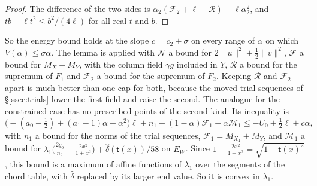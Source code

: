 \begin{proof}
The difference of the two sides is $\alpha_2(\mathcal F_2+\ell-\mathcal R)-\ell\alpha_2^2$, and
$tb-\ell t^2\le b^2/(4\ell)$ for all real $t$ and $b$.
\end{proof}

So the energy bound holds at the slope $c=c_2+\sigma$ on every range of $\alpha$ on which $V(\alpha)\le\sigma\alpha$.
The lemma is applied with $\mathcal N$ a bound for $2\|u\|^2+\frac12\|v\|^2$, $\mathcal F$ a bound for $M_X+M_Y$, with the
column field $\gamma g$ included in $Y$, $\mathcal R$ a bound for the supremum of $F_1$ and $\mathcal F_2$ a bound for the
supremum of $F_2$. Keeping $\mathcal R$ and $\mathcal F_2$ apart is much better than one cap for both, because the moved
trial sequences of \S\ref{ssec:trials} lower the first field and raise the second. The analogue for the constrained case has no prescribed
points of the second kind. Its inequality is
\[
 \bigl(-(a_0-\tfrac12)+(a_1-1)\alpha-\alpha^2\bigr)\ell+n_1+(1-\alpha)\mathcal F_1+\alpha\mathcal M_1
 \le-U_0+\tfrac12\ell+c\alpha,
\]
with $n_1$ a bound for the norms of the trial sequences, $\mathcal F_1=M_{X_1}+M_Y$, and $\mathcal M_1$ a bound for
$\lambda_1\bigl(\frac{2g_0}{n_0}-\frac{2x^2}{1+x^2}\bigr)+\hat\delta(\mathsf t(x))/58$ on $E_W$. Since
$1-\frac{2x^2}{1+x^2}=\sqrt{1-\mathsf t(x)^2}$, this bound is a maximum of affine functions of $\lambda_1$ over the
segments of the chord table, with $\hat\delta$ replaced by its larger end value. So it is convex in $\lambda_1$.

